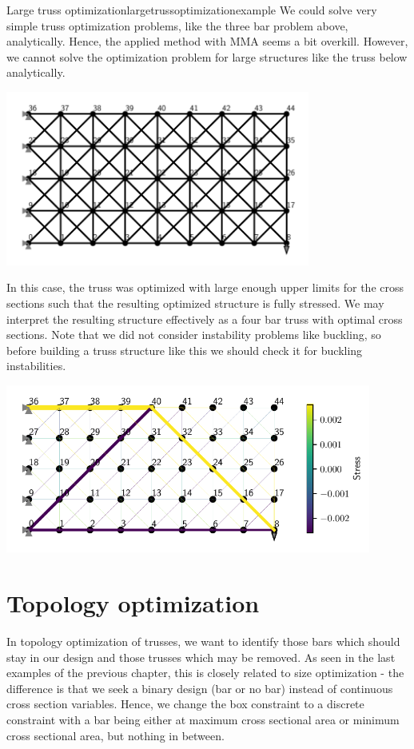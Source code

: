 \begin{example}{Large truss optimization}{largetrussoptimizationexample} 
    We could solve very simple truss optimization problems, like the three bar problem above, analytically. Hence, the applied method with MMA seems a bit overkill. 
    However, we cannot solve the optimization problem for large structures like the truss below analytically. 

    \begin{center}
        \includegraphics[width=0.75\textwidth]{figures/large_truss.pdf} 
    \end{center}

    In this case, the truss was optimized with large enough upper limits for the cross sections such that the resulting optimized structure is fully stressed. We may interpret the resulting structure effectively as a four bar truss with optimal cross sections. Note that we did not consider instability problems like buckling, so before building a truss structure like this we should check it for buckling instabilities.

    \begin{center}
        \includegraphics[width=0.9\textwidth]{figures/large_truss_optimized.pdf} 
    \end{center}
\end{example}

\section{Topology optimization}
In topology optimization of trusses, we want to identify those bars which should stay in our design and those trusses which may be removed. As seen in the last examples of the previous chapter, this is closely related to size optimization - the difference is that we seek a binary design (bar or no bar) instead of continuous cross section variables. Hence, we change the box constraint to a discrete constraint with a bar being either at maximum cross sectional area or minimum cross sectional area, but nothing in between.

